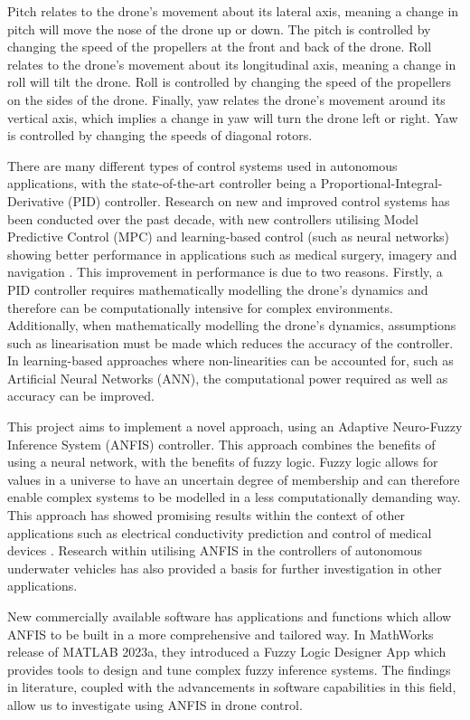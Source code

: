 Pitch relates to the drone’s movement about its lateral axis, meaning a change in pitch will move the nose of the drone up or down. The pitch is controlled by changing the speed of the propellers at the front and back of the drone. Roll relates to the drone’s movement about its longitudinal axis, meaning a change in roll will tilt the drone. Roll is controlled by changing the speed of the propellers on the sides of the drone. Finally, yaw relates the drone’s movement around its vertical axis, which implies a change in yaw will turn the drone left or right. Yaw is controlled by changing the speeds of diagonal rotors.

There are many different types of control systems used in autonomous applications, with the state-of-the-art controller being a Proportional-Integral-Derivative (PID) controller. Research on new and improved control systems has been conducted over the past decade, with new controllers utilising Model Predictive Control (MPC) and learning-based control (such as neural networks) showing better performance in applications such as medical surgery, imagery and navigation \cite{zain11,zain9}. This improvement in performance is due to two reasons. Firstly, a PID controller requires mathematically modelling the drone’s dynamics and therefore can be computationally intensive for complex environments. Additionally, when mathematically modelling the drone’s dynamics, assumptions such as linearisation must be made which reduces the accuracy of the controller. In learning-based approaches where non-linearities can be accounted for, such as Artificial Neural Networks (ANN), the computational power required as well as accuracy can be improved. 

This project aims to implement a novel approach, using an Adaptive Neuro-Fuzzy Inference System (ANFIS) controller. This approach combines the benefits of using a neural network, with the benefits of fuzzy logic. Fuzzy logic allows for values in a universe to have an uncertain degree of membership and can therefore enable complex systems to be modelled in a less computationally demanding way. This approach has showed promising results within the context of other applications such as electrical conductivity prediction and control of medical devices \cite{boxi1,zain11}. Research within utilising ANFIS in the controllers of autonomous underwater vehicles has also provided a basis for further investigation in other applications. 

New commercially available software has applications and functions which allow ANFIS to be built in a more comprehensive and tailored way. In MathWorks release of MATLAB 2023a, they introduced a Fuzzy Logic Designer App which provides tools to design and tune complex fuzzy inference systems. The findings in literature, coupled with the advancements in software capabilities in this field, allow us to investigate using ANFIS in drone control.
 
